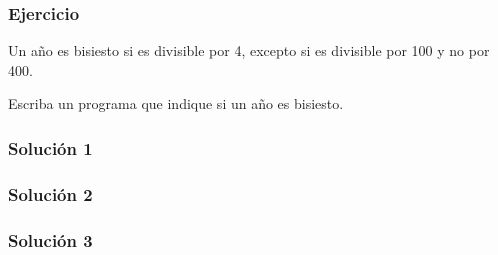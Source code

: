 \documentclass[12pt]{beamer}
\begin{document}
  \begin{frame}
    \label{solucion-if-elif}
    
  \end{frame}

  \begin{frame}
    \frametitle{Ejercicio}

    Un año es bisiesto si es divisible por 4,
    excepto si es divisible por 100 y no por 400.
    
    Escriba un programa que indique
    si un año es bisiesto.
    \vfill
    
    
    
    
  \end{frame}

  \begin{frame}
    \label{bisiesto-1}
    \frametitle{Solución 1}
    
  \end{frame}

  \begin{frame}
    \label{bisiesto-2}
    \frametitle{Solución 2}
    
  \end{frame}

  \begin{frame}
    \label{bisiesto-3}
    \frametitle{Solución 3}
    
  \end{frame}
\end{document}
